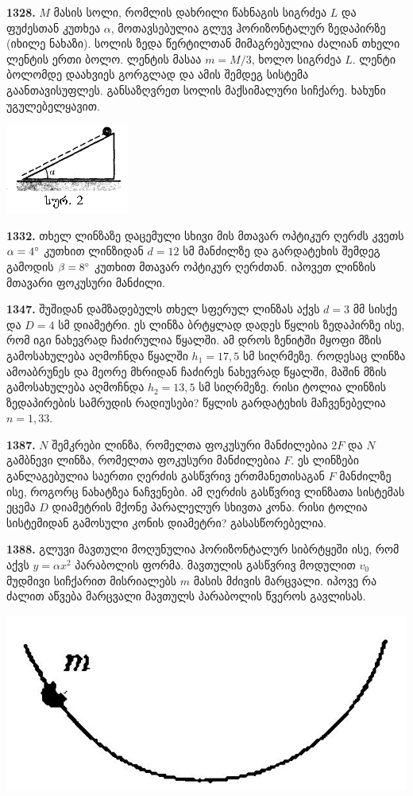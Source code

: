 \documentclass[12pt,a4paper,]{report}
\begin{document}
\textbf{1328.} $M$ მასის სოლი, რომლის დახრილი წახნაგის სიგრძეა $L$ და ფუძესთან კუთხეა $\alpha$, მოთავსებულია გლუვ ჰორიზონტალურ ზედაპირზე (იხილე ნახაზი). სოლის ზედა წერტილთან მიმაგრებულია ძალიან თხელი ლენტის ერთი ბოლო. ლენტის მასაა $m=M/3$, ხოლო სიგრძეა $L$. ლენტი ბოლომდე დაახვიეს გორგლად და ამის შემდეგ სისტემა გაანთავისუფლეს. განსაზღვრეთ სოლის მაქსიმალური სიჩქარე. ხახუნი უგულებელყავით.                                                                   
		\begin{center}
			\includegraphics[scale=0.5]{images/F1328.png}
		\end{center}

\textbf{1332.} თხელ ლინზაზე დაცემული სხივი მის მთავარ ოპტიკურ ღერძს კვეთს $\alpha = 4 \degree$ კუთხით ლინზიდან $d=12$ სმ მანძილზე და გარდატეხის შემდეგ გამოდის $\beta = 8 \degree$ კუთხით მთავარ ოპტიკურ ღერძთან. იპოვეთ ლინზის მთავარი ფოკუსური მანძილი.

\textbf{1347.} შუშიდან დამზადებულს თხელ სფერულ ლინზას აქვს $d=3$ მმ სისქე და $D=4$ სმ დიამეტრი. ეს ლინზა ბრტყლად დადეს წყლის ზედაპირზე ისე, რომ იგი ნახევრად ჩაძირულია წყალში. ამ დროს ზენიტში მყოფი მზის გამოსახულება აღმოჩნდა წყალში $h_1=17,5$ სმ სიღრმეზე. როდესაც ლინზა ამოაბრუნეს და  მეორე მხრიდან ჩაძირეს ნახევრად წყალში, მაშინ მზის გამოსახულება აღმოჩნდა $h_2=13,5$ სმ სიღრმეზე. რისი ტოლია ლინზის ზედაპირების სამრუდის რადიუსები? წყლის გარდატეხის მაჩვენებელია $n=1,33$.

\textbf{1387.} $N$ შემკრები ლინზა, რომელთა ფოკუსური მანძილებია $2F$ და $N$ გამბნევი ლინზა, რომელთა ფოკუსური მანძილებია $F$. ეს ლინზები განლაგებულია საერთი ღერძის გასწვრივ ერთმანეთისაგან $F$ მანძილზე ისე, როგორც ნახატზეა ნაჩვენები. ამ ღერძის გასწვრივ ლინზათა სისტემას ეცემა $D$ დიამეტრის მქონე პარალელურ სხივთა კონა. რისი ტოლია სისტემიდან გამოსული კონის დიამეტრი? გასასწორებელია. 
		
\textbf{1388.} გლუვი მავთული მოღუნულია ჰორიზონტალურ სიბრტყეში ისე, რომ აქვს $y=\alpha x^2$ პარაბოლის ფორმა. მავთულის გასწვრივ მოდულით $v_0$ მუდმივი   სიჩქარით მისრიალებს $m$ მასის მძივის მარცვალი. იპოვე რა ძალით აწვება მარცვალი მავთულს პარაბოლის წვეროს გავლისას.                            
		\begin{center}
			\includegraphics[scale=0.2]{images/F1388.jpg}
		\end{center}
\end{document}

